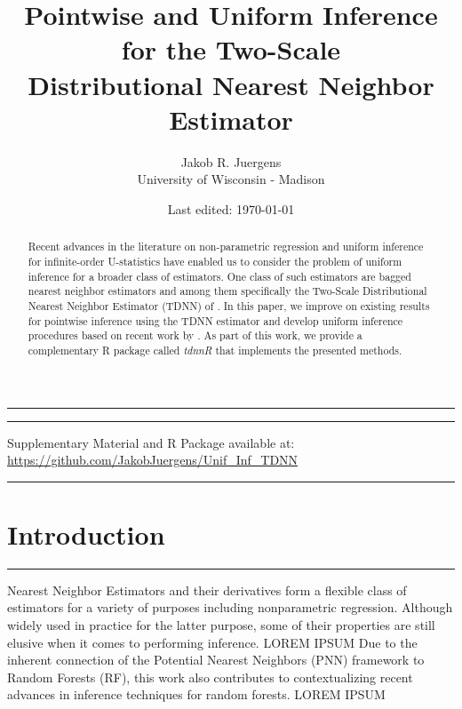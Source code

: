 \documentclass[letterpaper,10pt]{article}
\numberwithin{equation}{section}
\numberwithin{thm}{section}
\numberwithin{lem}{section}
\numberwithin{cor}{section}
\newcommand{\1}{\mathbbm{1}}
\begin{document}
\singlespacing
\title{Pointwise and Uniform Inference for the Two-Scale\\ Distributional Nearest Neighbor Estimator}
\date{Last edited: \today}
\author{Jakob R. Juergens \\ University of Wisconsin - Madison}
\maketitle
\hrule
\onehalfspacing
\begin{abstract}
	Recent advances in the literature on non-parametric regression and uniform inference for infinite-order U-statistics have enabled us to consider the problem of uniform inference for a broader class of estimators.
	One class of such estimators are bagged nearest neighbor estimators and among them specifically the Two-Scale Distributional Nearest Neighbor Estimator (TDNN) of \citet{demirkaya_optimal_2024}.
	In this paper, we improve on existing results for pointwise inference using the TDNN estimator and develop uniform inference procedures based on recent work by \citet{ritzwoller_uniform_2024}.
	As part of this work, we provide a complementary R package called \textit{tdnnR} that implements the presented methods.
\end{abstract}
\vspace{0.3cm}
\hrule
\singlespacing

\vspace{-0.3cm}
\begin{center}
	{\small Supplementary Material and R Package available at: \url{https://github.com/JakobJuergens/Unif_Inf_TDNN}}
\end{center}
\vspace{0.3cm}
\hrule
\singlespacing
\thispagestyle{empty}


\newpage
\onehalfspacing
\section{Introduction}
\hrule
Nearest Neighbor Estimators and their derivatives form a flexible class of estimators for a variety of purposes including nonparametric regression.
Although widely used in practice for the latter purpose, some of their properties are still elusive when it comes to performing inference.
	{\color{red} LOREM IPSUM}
Due to the inherent connection of the Potential Nearest Neighbors (PNN) framework to Random Forests (RF), this work also contributes to contextualizing recent advances in inference techniques for random forests.
	{\color{red} LOREM IPSUM}
\end{document}
